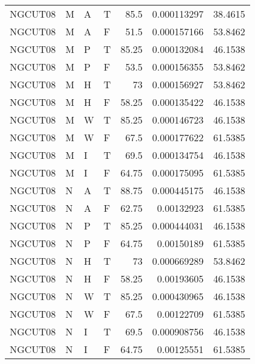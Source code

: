 \begin{tabular}{llllrrr}
    NGCUT08  & M     & A     & T          & 85.5       & 0.000113297 & 38.4615  \\
    NGCUT08  & M     & A     & F          & 51.5       & 0.000157166 & 53.8462  \\
    NGCUT08  & M     & P     & T          & 85.25      & 0.000132084 & 46.1538  \\
    NGCUT08  & M     & P     & F          & 53.5       & 0.000156355 & 53.8462  \\
    NGCUT08  & M     & H     & T          & 73         & 0.000156927 & 53.8462  \\
    NGCUT08  & M     & H     & F          & 58.25      & 0.000135422 & 46.1538  \\
    NGCUT08  & M     & W     & T          & 85.25      & 0.000146723 & 46.1538  \\
    NGCUT08  & M     & W     & F          & 67.5       & 0.000177622 & 61.5385  \\
    NGCUT08  & M     & I     & T          & 69.5       & 0.000134754 & 46.1538  \\
    NGCUT08  & M     & I     & F          & 64.75      & 0.000175095 & 61.5385  \\
    NGCUT08  & N     & A     & T          & 88.75      & 0.000445175 & 46.1538  \\
    NGCUT08  & N     & A     & F          & 62.75      & 0.00132923  & 61.5385  \\
    NGCUT08  & N     & P     & T          & 85.25      & 0.000444031 & 46.1538  \\
    NGCUT08  & N     & P     & F          & 64.75      & 0.00150189  & 61.5385  \\
    NGCUT08  & N     & H     & T          & 73         & 0.000669289 & 53.8462  \\
    NGCUT08  & N     & H     & F          & 58.25      & 0.00193605  & 46.1538  \\
    NGCUT08  & N     & W     & T          & 85.25      & 0.000430965 & 46.1538  \\
    NGCUT08  & N     & W     & F          & 67.5       & 0.00122709  & 61.5385  \\
    NGCUT08  & N     & I     & T          & 69.5       & 0.000908756 & 46.1538  \\
    NGCUT08  & N     & I     & F          & 64.75      & 0.00125551  & 61.5385  \\
    \hline
\end{tabular}
